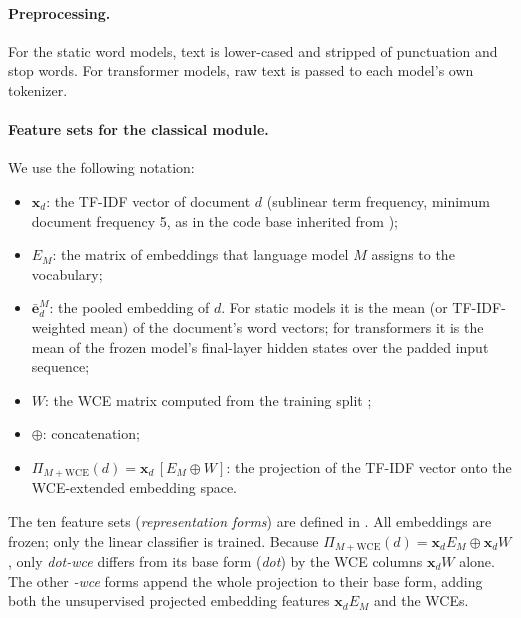 \documentclass{ijis}
\begin{document}
\paragraph{Preprocessing.} For the static word models, text is lower-cased and stripped of punctuation and stop words. For transformer models, raw text is passed to each model's own tokenizer.

\paragraph{Feature sets for the classical module.} We use the following notation:
\begin{itemize}
\setlength\itemsep{1pt}
\item $\mathbf{x}_d$: the TF-IDF vector of document $d$ (sublinear term frequency, minimum document frequency 5, as in the code base inherited from \cite{moreo2021});
\item $E_M$: the matrix of embeddings that language model $M$ assigns to the vocabulary;
\item $\bar{\mathbf{e}}^{M}_d$: the pooled embedding of $d$. For static models it is the mean (or TF-IDF-weighted mean) of the document's word vectors; for transformers it is the mean of the frozen model's final-layer hidden states over the padded input sequence;
\item $W$: the WCE matrix computed from the training split \cite{moreo2021};
\item $\oplus$: concatenation;
\item $\Pi_{M+\mathrm{WCE}}(d) = \mathbf{x}_d\,[E_M \oplus W]$: the projection of the TF-IDF vector onto the WCE-extended embedding space.
\end{itemize}
The ten feature sets (\emph{representation forms}) are defined in . All embeddings are frozen; only the linear classifier is trained. Because $\Pi_{M+\mathrm{WCE}}(d) = \mathbf{x}_d E_M \oplus \mathbf{x}_d W$, only \emph{dot-wce} differs from its base form (\emph{dot}) by the WCE columns $\mathbf{x}_d W$ alone. The other \emph{-wce} forms append the whole projection to their base form, adding both the unsupervised projected embedding features $\mathbf{x}_d E_M$ and the WCEs.
\end{document}
